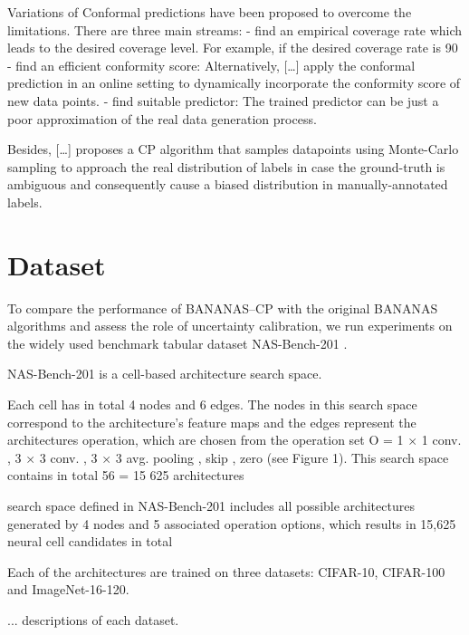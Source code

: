 \documentclass[a4paper,oneside,bibliography=totoc]{scrbook}
\begin{document}
Variations of Conformal predictions have been proposed to overcome the limitations. There are three main streams:
- find an empirical coverage rate which leads to the desired coverage level. For example, if the desired coverage rate is 90%
- find an efficient conformity score: Alternatively, […] apply the conformal prediction in an online setting to dynamically incorporate the conformity score of new data points.
- find suitable predictor: The trained predictor can be just a poor approximation of the real data generation process.

Besides, […] proposes a CP algorithm that samples datapoints using Monte-Carlo sampling to approach the real distribution of labels in case the ground-truth is ambiguous and consequently cause a biased distribution in manually-annotated labels.






\chapter{Dataset}
\label{Dataset}
To compare the performance of BANANAS--CP with the original BANANAS algorithms and assess the role of uncertainty calibration, we run experiments on the widely used benchmark tabular dataset NAS-Bench-201 \cite{dong2020nasbench201}.

NAS-Bench-201 is a cell-based architecture search space. 





 Each cell has in total 4 nodes and 6 edges. The nodes in this search space correspond to the architecture’s feature maps and the edges represent the architectures operation, which are chosen from the operation set O = {1 × 1 conv. , 3 × 3 conv. , 3 × 3 avg. pooling , skip , zero} (see Figure 1). This search space contains in total 56 = 15 625 architectures

 search space defined in NAS-Bench-201 includes all possible architectures generated by 4 nodes and 5 associated operation options, which results in 15,625 neural cell candidates in total
 
Each of the architectures are trained on three datasets: CIFAR-10, CIFAR-100 and ImageNet-16-120. 

... descriptions of each dataset.
\end{document}
